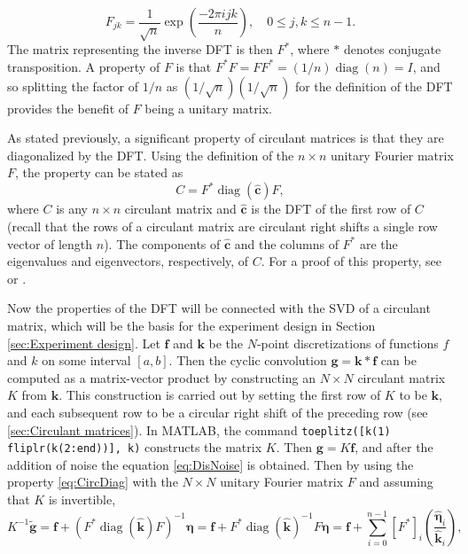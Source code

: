 \documentclass[12pt]{article}
\newcommand{\kcon}{k}
\newcommand{\fcon}{f}
\newcommand{\gdis}{\mathbf{g}}
\newcommand{\gnoise}{\widetilde{\mathbf{g}}}
\newcommand{\kdis}{\mathbf{k}}
\newcommand{\kmat}{K}	%
\newcommand{\fdis}{\mathbf{f}}
\newcommand{\ctrans}{*}	%
\newcommand{\diag}{\operatorname{diag}}
\newcommand{\noise}{\bm{\eta}}	%
\begin{document}
\begin{equation}
F_{jk} = \frac{1}{\sqrt{n}}\exp\left(\frac{-2\pi{ijk}}{n}\right), \quad 0 \leq j,k \leq n-1.
\label{eq:DFT-Matrix}
\end{equation}
The matrix representing the inverse DFT is then $F^\ctrans$, where $\ctrans$ denotes conjugate transposition. A property of $F$ is that $F^\ctrans F = FF^\ctrans = (1/n)\diag(n) = I$, and so splitting the factor of $1/n$ as $(1/\sqrt{n})(1/\sqrt{n})$ for the definition of the DFT provides the benefit of $F$ being a unitary matrix. \par 
As stated previously, a significant property of circulant matrices is that they are diagonalized by the DFT. Using the definition of the $n \times n$ unitary Fourier matrix $F$, the property can be stated as
\begin{equation}
C = F^\ctrans\diag(\widehat{\mathbf{c}})F,
\label{eq:CircDiag}
\end{equation}
where $C$ is any $n \times n$ circulant matrix and $\widehat{\mathbf{c}}$ is the DFT of the first row of $C$ (recall that the rows of a circulant matrix are circulant right shifts a single row vector of length $n$). The components of $\widehat{\mathbf{c}}$ and the columns of $F^\ctrans$ are the eigenvalues and eigenvectors, respectively, of $C$. For a proof of this property, see \cite{BoggessAlbert2001Afci} or \cite{Vogel:2002}. \par
Now the properties of the DFT will be connected with the SVD of a circulant matrix, which will be the basis for the experiment design in Section \ref{sec:Experiment design}. Let $\fdis$ and $\kdis$ be the $N$-point discretizations of functions $\fcon$ and $\kcon$ on some interval $[a,b]$. Then the cyclic convolution $\gdis = \kdis * \fdis$ can be computed as a matrix-vector product by constructing an $N \times N$ circulant matrix $\kmat$ from $\kdis$. This construction is carried out by setting the first row of $\kmat$ to be $\kdis$, and each subsequent row to be a circular right shift of the preceding row (see \ref{sec:Circulant matrices}). In MATLAB, the command \texttt{toeplitz([k(1) fliplr(k(2:end))], k)} constructs the matrix $\kmat$. Then $\gdis = \kmat\fdis$, and after the addition of noise the equation \eqref{eq:DisNoise} is obtained. Then by using the property \eqref{eq:CircDiag} with the $N \times N$ unitary Fourier matrix $F$ and assuming that $\kmat$ is invertible, 
\begin{equation}
\kmat^{-1}\gnoise = \fdis + (F^*\diag(\widehat{\kdis})F)^{-1}\noise = \fdis + F^*\diag(\widehat{\kdis})^{-1}F\noise = \fdis + \sum_{i = 0}^{n-1} [F^*]_i\left(\frac{\widehat{\noise}_i}{\widehat{\kdis}_i}\right),
\label{eq:InvProdDFT}
\end{equation}
\end{document}
